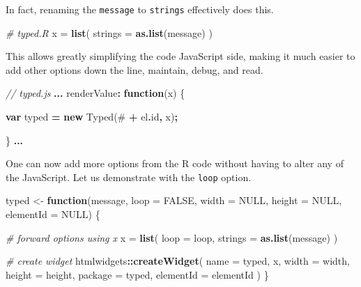 \documentclass[
]{krantz}
\makeatletter
\newenvironment{Shaded}{\begin{snugshade}}{\end{snugshade}}
\newcommand{\AttributeTok}[1]{\textcolor[rgb]{0.61,0.61,0.61}{#1}}
\newcommand{\CommentTok}[1]{\textcolor[rgb]{0.37,0.37,0.37}{\textit{#1}}}
\newcommand{\ControlFlowTok}[1]{\textcolor[rgb]{0.27,0.27,0.27}{\textbf{#1}}}
\newcommand{\DataTypeTok}[1]{\textcolor[rgb]{0.27,0.27,0.27}{#1}}
\newcommand{\KeywordTok}[1]{\textcolor[rgb]{0.27,0.27,0.27}{\textbf{#1}}}
\newcommand{\NormalTok}[1]{#1}
\newcommand{\OperatorTok}[1]{\textcolor[rgb]{0.43,0.43,0.43}{\textbf{#1}}}
\newcommand{\OtherTok}[1]{\textcolor[rgb]{0.37,0.37,0.37}{#1}}
\newcommand{\StringTok}[1]{\textcolor[rgb]{0.5,0.5,0.5}{#1}}
\newenvironment{kframe}{%
\medskip{}
\setlength{\fboxsep}{.8em}
 \def\at@end@of@kframe{}%
 \ifinner\ifhmode%
  \def\at@end@of@kframe{\end{minipage}}%
  \begin{minipage}{\columnwidth}%
 \fi\fi%
 \def\FrameCommand##1{\hskip\@totalleftmargin \hskip-\fboxsep
 \colorbox{shadecolor}{##1}\hskip-\fboxsep
     \hskip-\linewidth \hskip-\@totalleftmargin \hskip\columnwidth}%
 \MakeFramed {\advance\hsize-\width
   \@totalleftmargin\z@ \linewidth\hsize
   \@setminipage}}%
 {\par\unskip\endMakeFramed%
 \at@end@of@kframe}
\renewenvironment{Shaded}{\begin{kframe}}{\end{kframe}}
\makeatother
\begin{document}
In fact, renaming the \texttt{message} to \texttt{strings} effectively does this.

\begin{Shaded}
\begin{Highlighting}[]
\CommentTok{\# typed.R}
\NormalTok{x =}\StringTok{ }\KeywordTok{list}\NormalTok{(}
  \DataTypeTok{strings =} \KeywordTok{as.list}\NormalTok{(message)}
\NormalTok{)}
\end{Highlighting}
\end{Shaded}

This allows greatly simplifying the code JavaScript side, making it much easier to add other options down the line, maintain, debug, and read.

\begin{Shaded}
\begin{Highlighting}[]
\CommentTok{// typed.js}
\OperatorTok{...}
\NormalTok{renderValue}\OperatorTok{:} \KeywordTok{function}\NormalTok{(x) \{}

  \KeywordTok{var}\NormalTok{ typed }\OperatorTok{=} \KeywordTok{new}\NormalTok{ Typed(}\StringTok{\textquotesingle{}\#\textquotesingle{}} \OperatorTok{+}\NormalTok{ el}\OperatorTok{.}\AttributeTok{id}\OperatorTok{,}\NormalTok{ x)}\OperatorTok{;}

\NormalTok{\}}
\OperatorTok{...}
\end{Highlighting}
\end{Shaded}

One can now add more options from the R code without having to alter any of the JavaScript. Let us demonstrate with the \texttt{loop} option.

\begin{Shaded}
\begin{Highlighting}[]
\NormalTok{typed \textless{}{-}}\StringTok{ }\ControlFlowTok{function}\NormalTok{(message, }\DataTypeTok{loop =} \OtherTok{FALSE}\NormalTok{, }\DataTypeTok{width =} \OtherTok{NULL}\NormalTok{, }\DataTypeTok{height =} \OtherTok{NULL}\NormalTok{, }\DataTypeTok{elementId =} \OtherTok{NULL}\NormalTok{) \{}

  \CommentTok{\# forward options using x}
\NormalTok{  x =}\StringTok{ }\KeywordTok{list}\NormalTok{(}
    \DataTypeTok{loop =}\NormalTok{ loop,}
    \DataTypeTok{strings =} \KeywordTok{as.list}\NormalTok{(message)}
\NormalTok{  )}

  \CommentTok{\# create widget}
\NormalTok{  htmlwidgets}\OperatorTok{::}\KeywordTok{createWidget}\NormalTok{(}
    \DataTypeTok{name =} \StringTok{\textquotesingle{}typed\textquotesingle{}}\NormalTok{,}
\NormalTok{    x,}
    \DataTypeTok{width =}\NormalTok{ width,}
    \DataTypeTok{height =}\NormalTok{ height,}
    \DataTypeTok{package =} \StringTok{\textquotesingle{}typed\textquotesingle{}}\NormalTok{,}
    \DataTypeTok{elementId =}\NormalTok{ elementId}
\NormalTok{  )}
\NormalTok{\}}
\end{Highlighting}
\end{Shaded}
\end{document}
